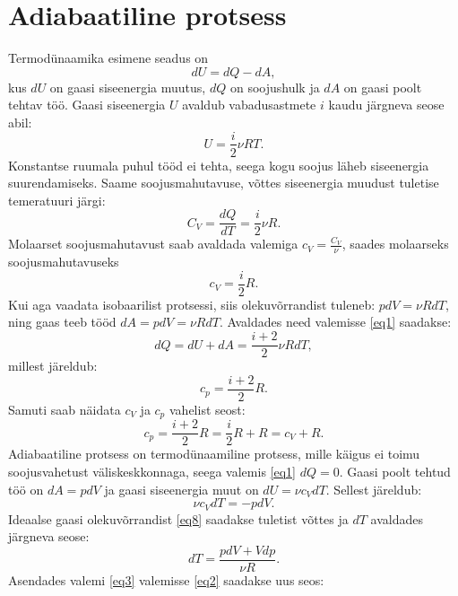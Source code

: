 \documentclass{trkut}%
\begin{document}
\section{Adiabaatiline protsess}
Termodünaamika esimene seadus on
\begin{equation}\label{eq1}
dU = dQ - dA ,
\end{equation}
kus $dU$ on gaasi siseenergia muutus, $dQ$ on soojushulk ja $dA$ on gaasi poolt tehtav töö. Gaasi siseenergia $U$ avaldub vabadusastmete $i$ kaudu järgneva seose abil:
\begin{equation}\label{eq5}
U = \frac{i}{2} \nu R T.
\end{equation}
Konstantse ruumala puhul tööd ei tehta, seega kogu soojus läheb siseenergia suurendamiseks. Saame soojusmahutavuse, võttes siseenergia muudust tuletise temeratuuri järgi:
\begin{equation}\label{eq6}
C_V = \frac{dQ}{dT}=\frac{i}{2}\nu R .
\end{equation}
Molaarset soojusmahutavust saab avaldada valemiga $c_V = \frac{C_V}{\nu}$, saades molaarseks soojusmahutavuseks
\begin{equation}\label{eq7}
c_V = \frac{i}{2}R .
\end{equation}
Kui aga vaadata isobaarilist protsessi, siis olekuvõrrandist tuleneb: $pdV=\nu RdT$, ning gaas teeb tööd $dA = pdV = \nu RdT$. Avaldades need valemisse \ref{eq1} saadakse:
\begin{equation}
dQ = dU + dA = \frac{i+2}{2} \nu R dT ,
\end{equation}
millest järeldub:
\begin{equation}
c_p=\frac{i+2}{2}R.
\end{equation}
Samuti saab näidata $c_V$ ja $c_p$ vahelist seost:
\begin{equation}\label{eq9}
c_p =\frac{i+2}{2}R = \frac{i}{2}R + R = c_V + R.
\end{equation}
Adiabaatiline protsess on termodünaamiline protsess, mille käigus ei toimu soojusvahetust väliskeskkonnaga, seega valemis \ref{eq1} $dQ=0$. Gaasi poolt tehtud töö on $d A=pdV$ ja gaasi siseenergia muut on $dU=\nu c_VdT$. Sellest järeldub:
\begin{equation}\label{eq2}
\nu c_VdT = -pdV.
\end{equation}
Ideaalse gaasi olekuvõrrandist \ref{eq8} saadakse tuletist võttes ja $dT$ avaldades järgneva seose:
\begin{equation}\label{eq3}
dT = \frac{pdV+Vdp}{\nu R}.
\end{equation}
Asendades valemi \ref{eq3} valemisse \ref{eq2} saadakse uus seos:
\end{document}
